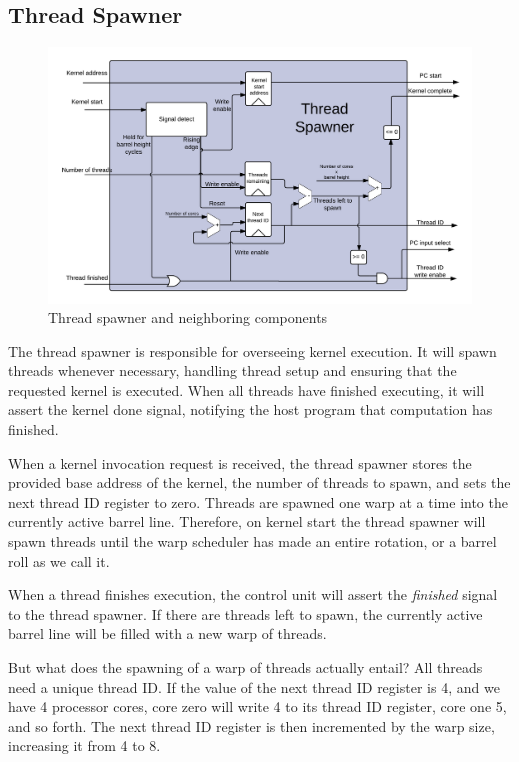 \subsection{Thread Spawner}

\begin{figure}[H]
	\centering
	\includegraphics[width=1.1\textwidth]{../gpu/diagrams/thread_spawner.png}
	\caption{Thread spawner and neighboring components}
	\label{fig:thread_spawner}
\end{figure}

The thread spawner is responsible for overseeing kernel execution.
It will spawn threads whenever necessary, handling thread setup and ensuring that the requested kernel is executed.
When all threads have finished executing, it will assert the kernel done signal, notifying the host program that computation has finished.

When a kernel invocation request is received, the thread spawner stores the provided base address of the kernel, the number of threads to spawn, and sets the next thread ID register to zero.
Threads are spawned one warp at a time into the currently active barrel line.
Therefore, on kernel start the thread spawner will spawn threads until the warp scheduler has made an entire rotation, or a barrel roll as we call it.

When a thread finishes execution, the control unit will assert the \emph{finished} signal to the thread spawner.
If there are threads left to spawn, the currently active barrel line will be filled with a new warp of threads.

But what does the spawning of a warp of threads actually entail?
All threads need a unique thread ID.
If the value of the next thread ID register is 4, and we have 4 processor cores,
core zero will write 4 to its thread ID register, core one 5, and so forth.
The next thread ID register is then incremented by the warp size, increasing it from 4 to 8.

